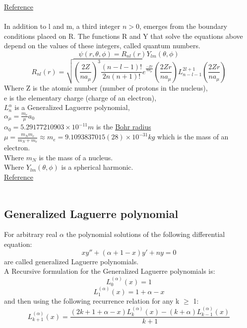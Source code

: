 \documentclass[10pt]{extarticle}
\begin{document}
\href{https://en.wikipedia.org/wiki/Particle_in_a_spherically_symmetric_potential}{Reference} \\ \\
In addition to l and m, a third integer $n > 0$, emerges from the boundary conditions placed on R. The functions R and Y that solve the equations above depend on the values of these integers, called quantum numbers. \\ 
$$\psi (r,\theta ,\phi )=R_{nl}(r)Y_{lm}(\theta ,\phi )$$
$$R_{nl}(r) = \sqrt{\left(\frac{2Z}{na_\mu}\right)^3\frac{(n-l-1)!}{2n(n+1)!}}e^{\frac{-Zr}{na_\mu}}\left(\frac{2Zr}{na_\mu}\right)L_{n-l-1}^{2l+1}\left(\frac{2Zr}{na_\mu}\right) $$
Where Z is the atomic number (number of protons in the nucleus), \\
e is the elementary charge (charge of an electron), \\
$L_n^\alpha$ is a Generalized Laguerre polynomial, \\
$\alpha_\mu = \frac{m_e}{\mu}a_0$ \\
$\alpha_0 = 5.29177210903\times10^{-11} m$ is the \href{https://en.wikipedia.org/wiki/Bohr_radius}{Bohr radius} \\
$\mu = \frac{m_Nm_e}{m_N + m_e} \approx m_e = 9.1093837015(28)\times10^{-31} kg$ which is the mass of an electron. \\
Where $m_N$ is the mass of a nucleus. \\ 
Where $Y_{lm}(\theta ,\phi )$ is a spherical harmonic. \\ 
\href{https://en.wikipedia.org/wiki/Hydrogen-like_atom}{Reference} \\ \\
\subsection{Generalized Laguerre polynomial}
For arbitrary real $\alpha$ the polynomial solutions of the following differential equation: 
$$xy'' + (\alpha +1 - x)y' + ny = 0$$
are called generalized Laguerre polynomials. \\
A Recursive formulation for the Generalized Laguerre polynomials is: \\
$$L_{0}^{(\alpha )}(x)=1
$$
$$L_{1}^{(\alpha )}(x)=1+\alpha -x
$$
and then using the following recurrence relation for any k $\geq$ 1:
$$L_{k+1}^{(\alpha )}(x)={\frac {(2k+1+\alpha -x)L_{k}^{(\alpha )}(x)-(k+\alpha )L_{k-1}^{(\alpha )}(x)}{k+1}}$$
\end{document}

